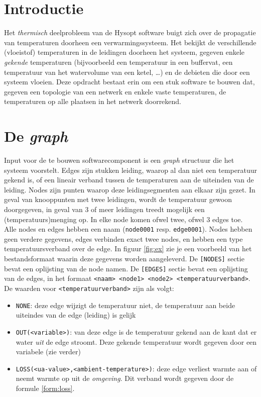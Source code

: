 \documentclass[12pt]{article}
\begin{document}
\section{Introductie}

Het \emph{thermisch} deelprobleem van de Hysopt software buigt zich over de propagatie van temperaturen doorheen een verwarmingssysteem. Het bekijkt de verschillende (vloeistof) temperaturen in de leidingen doorheen het systeem, gegeven enkele \emph{gekende} temperaturen (bijvoorbeeld een temperatuur in een buffervat, een temperatuur van het watervolume van een ketel, \ldots) en de debieten die door een systeem vloeien. Deze opdracht bestaat erin om een stuk software te bouwen dat, gegeven een topologie van een netwerk en enkele vaste temperaturen, de temperaturen op alle plaatsen in het netwerk doorrekend.


\section{De \emph{graph}}

Input voor de te bouwen softwarecomponent is een \emph{graph} structuur die het systeem voorstelt. Edges zijn stukken leiding, waarop al dan niet een temperatuur gekend is, of een lineair verband tussen de temperaturen aan de uiteinden van de leiding. Nodes zijn punten waarop deze leidingsegmenten aan elkaar zijn gezet. In geval van knooppunten met twee leidingen, wordt de temperatuur gewoon doorgegeven, in geval van 3 of meer leidingen treedt mogelijk een (temperatuurs)menging op. In elke node komen ofwel twee, ofwel 3 edges toe. Alle nodes en edges hebben een naam (\verb|node0001| resp. \verb|edge0001|). Nodes hebben geen verdere gegevens, edges verbinden exact twee nodes, en hebben een type temperatuursverband over de edge. In figuur \ref{fig:ex} zie je een voorbeeld van het bestandsformaat waarin deze gegevens worden aangeleverd. De \verb|[NODES]| sectie bevat een oplijsting van de node namen. De \verb|[EDGES]| sectie bevat een oplijsting van de edges, in het formaat \verb|<naam> <node1> <node2> <temperatuurverband>|. De waarden voor \verb|<temperatuurverband>| zijn als volgt:
\begin{itemize}
	\item \verb|NONE|: deze edge wijzigt de temperatuur niet, de temperatuur aan beide uiteindes van de edge (leiding) is gelijk
	\item \verb|OUT(<variable>)|: van deze edge is de temperatuur gekend aan de kant dat er water \emph{uit} de edge stroomt. Deze gekende temperatuur wordt gegeven door een variabele (zie verder)
	\item \verb|LOSS(<ua-value>,<ambient-temperature>)|: deze edge verliest warmte aan of neemt warmte op uit de \emph{omgeving}. Dit verband wordt gegeven door de formule \ref{form:loss}.
\end{itemize}
\end{document}
